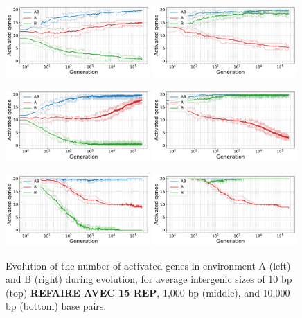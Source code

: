 \begin{figure}
\includegraphics[width=0.49\textwidth]{param/mean-intergene/inter-0.01k/gene_activity_env_A.pdf}
\includegraphics[width=0.49\textwidth]{param/mean-intergene/inter-0.01k/gene_activity_env_B.pdf}

\includegraphics[width=0.49\textwidth]{param/mean-intergene/inter-1k/gene_activity_env_A.pdf}
\includegraphics[width=0.49\textwidth]{param/mean-intergene/inter-1k/gene_activity_env_B.pdf}

\includegraphics[width=0.49\textwidth]{param/mean-intergene/inter-10k/gene_activity_env_A.pdf}
\includegraphics[width=0.49\textwidth]{param/mean-intergene/inter-10k/gene_activity_env_B.pdf}
\caption{Evolution of the number of activated genes in environment A (left) and B (right) during evolution, for average intergenic sizes of 10 bp (top) \textbf{REFAIRE AVEC 15 REP}, 1,000 bp (middle), and 10,000 bp (bottom) base pairs.}
\end{figure}

